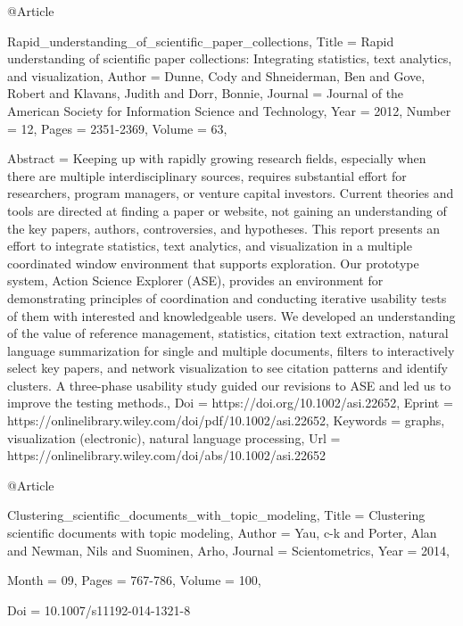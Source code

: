 @Article{Rapid_understanding_of_scientific_paper_collections,
  Title                    = {Rapid understanding of scientific paper collections: Integrating statistics, text analytics, and visualization},
  Author                   = {Dunne, Cody and Shneiderman, Ben and Gove, Robert and Klavans, Judith and Dorr, Bonnie},
  Journal                  = {Journal of the American Society for Information Science and Technology},
  Year                     = {2012},
  Number                   = {12},
  Pages                    = {2351-2369},
  Volume                   = {63},

  Abstract                 = {Keeping up with rapidly growing research fields, especially when there are multiple interdisciplinary sources, requires substantial effort for researchers, program managers, or venture capital investors. Current theories and tools are directed at finding a paper or website, not gaining an understanding of the key papers, authors, controversies, and hypotheses. This report presents an effort to integrate statistics, text analytics, and visualization in a multiple coordinated window environment that supports exploration. Our prototype system, Action Science Explorer (ASE), provides an environment for demonstrating principles of coordination and conducting iterative usability tests of them with interested and knowledgeable users. We developed an understanding of the value of reference management, statistics, citation text extraction, natural language summarization for single and multiple documents, filters to interactively select key papers, and network visualization to see citation patterns and identify clusters. A three-phase usability study guided our revisions to ASE and led us to improve the testing methods.},
  Doi                      = {https://doi.org/10.1002/asi.22652},
  Eprint                   = {https://onlinelibrary.wiley.com/doi/pdf/10.1002/asi.22652},
  Keywords                 = {graphs, visualization (electronic), natural language processing},
  Url                      = {https://onlinelibrary.wiley.com/doi/abs/10.1002/asi.22652}
}

@Article{Clustering_scientific_documents_with_topic_modeling,
  Title                    = {Clustering scientific documents with topic modeling},
  Author                   = {Yau, c-k and Porter, Alan and Newman, Nils and Suominen, Arho},
  Journal                  = {Scientometrics},
  Year                     = {2014},

  Month                    = {09},
  Pages                    = {767-786},
  Volume                   = {100},

  Doi                      = {10.1007/s11192-014-1321-8}
}

